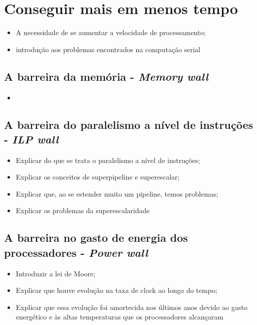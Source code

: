 \section{Conseguir mais em menos tempo}

    \begin{itemize}
        \item A necessidade de se aumentar a velocidade de processamento;
        \item introdução aos problemas encontrados na computação serial
    \end{itemize}

    \subsection{A barreira da memória - \textit{Memory wall}}
    
    
        \begin{itemize}
            \item 
        \end{itemize}
    
    \subsection{A barreira do paralelismo a nível de instruções - \textit{ILP wall}}
    
        \begin{itemize}
            \item Explicar do que se trata o paralelismo a nível de instruções;
            \item Explicar os conceitos de superpipeline e superescalar;
            \item Explicar que, ao se estender muito um pipeline, temos problemas;
            \item Explicar os problemas da superescalaridade
        \end{itemize}
    
    \subsection{A barreira no gasto de energia dos processadores - \textit{Power wall}}
    
        \begin{itemize}
            \item Introduzir a lei de Moore;
            \item Explicar que houve evolução na taxa de clock ao longo do tempo;
            \item Explicar que essa evolução foi amortecida nos últimos anos devido 
            ao gasto energético e às altas temperaturas que os processadores alcançaram 
        \end{itemize}